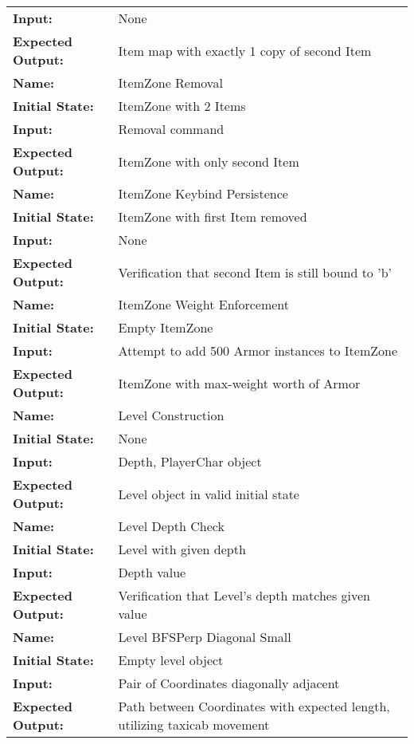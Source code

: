\documentclass[12pt, titlepage]{article}
\begin{document}
\begin{center}
\begin{longtable}{ l | p{10cm} }
				\textbf{Input:} & None\\
				\textbf{Expected Output:} & Item map with exactly 1 copy of second Item\\[0.6em]
				\hline
				\rule{0pt}{1.5em}\textbf{Name:} & ItemZone Removal\\
				\textbf{Initial State:} & ItemZone with 2 Items\\
				\textbf{Input:} & Removal command\\
				\textbf{Expected Output:} & ItemZone with only second Item\\[0.6em]
				\hline
				\rule{0pt}{1.5em}\textbf{Name:} & ItemZone Keybind Persistence\\
				\textbf{Initial State:} & ItemZone with first Item removed\\
				\textbf{Input:} & None\\
				\textbf{Expected Output:} & Verification that second Item is still bound to 'b'\\[0.6em]
				\hline
				\rule{0pt}{1.5em}\textbf{Name:} & ItemZone Weight Enforcement\\
				\textbf{Initial State:} & Empty ItemZone\\
				\textbf{Input:} & Attempt to add 500 Armor instances to ItemZone\\
				\textbf{Expected Output:} & ItemZone with max-weight worth of Armor\\[0.6em]
				\hline
				\rule{0pt}{1.5em}\textbf{Name:} & Level Construction\\
				\textbf{Initial State:} & None\\
				\textbf{Input:} & Depth, PlayerChar object\\
				\textbf{Expected Output:} & Level object in valid initial state\\[0.6em]
				\hline
				\rule{0pt}{1.5em}\textbf{Name:} & Level Depth Check\\
				\textbf{Initial State:} & Level with given depth\\
				\textbf{Input:} & Depth value\\
				\textbf{Expected Output:} & Verification that Level's depth matches given value\\[0.6em]
				\hline
				\rule{0pt}{1.5em}\textbf{Name:} & Level BFSPerp Diagonal Small\\
				\textbf{Initial State:} & Empty level object\\
				\textbf{Input:} & Pair of Coordinates diagonally adjacent\\
				\textbf{Expected Output:} & Path between Coordinates with expected length, utilizing taxicab movement\\[0.6em]

\end{longtable}
\end{center}
\end{document}
